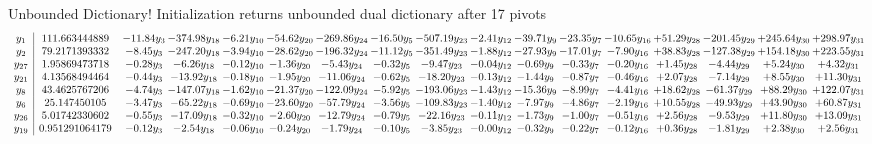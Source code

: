 \documentclass[9pt]{article}
\begin{document}
Unbounded Dictionary!
Initialization returns unbounded dual dictionary after 17 pivots
\[\begin{array}{c| c c@{\hskip 2pt} c@{\hskip 2pt} c@{\hskip 2pt} c@{\hskip 2pt} c@{\hskip 2pt} c@{\hskip 2pt} c@{\hskip 2pt} c@{\hskip 2pt} c@{\hskip 2pt} c@{\hskip 2pt} c@{\hskip 2pt} c@{\hskip 2pt} c@{\hskip 2pt} c@{\hskip 2pt} c@{\hskip 2pt} }
 y_{1}   &  111.663444889 & -11.84 y_{3} & -374.98 y_{18} & -6.21 y_{10} & -54.62 y_{20} & -269.86 y_{24} & -16.50 y_{5} & -507.19 y_{23} & -2.41 y_{12} & -39.71 y_{9} & -23.35 y_{7} & -10.65 y_{16} & + 51.29 y_{28} & -201.45 y_{29} & + 245.64 y_{30} & + 298.97 y_{31}\\
 y_{2}   &  79.2171393332 & -8.45 y_{3} & -247.20 y_{18} & -3.94 y_{10} & -28.62 y_{20} & -196.32 y_{24} & -11.12 y_{5} & -351.49 y_{23} & -1.88 y_{12} & -27.93 y_{9} & -17.01 y_{7} & -7.90 y_{16} & + 38.83 y_{28} & -127.38 y_{29} & + 154.18 y_{30} & + 223.55 y_{31}\\
 y_{27}   &  1.95869473718 & -0.28 y_{3} & -6.26 y_{18} & -0.12 y_{10} & -1.36 y_{20} & -5.43 y_{24} & -0.32 y_{5} & -9.47 y_{23} & -0.04 y_{12} & -0.69 y_{9} & -0.33 y_{7} & -0.20 y_{16} & +  1.45 y_{28} & -4.44 y_{29} & +  5.24 y_{30} & +  4.32 y_{31}\\
 y_{21}   &  4.13568494464 & -0.44 y_{3} & -13.92 y_{18} & -0.18 y_{10} & -1.95 y_{20} & -11.06 y_{24} & -0.62 y_{5} & -18.20 y_{23} & -0.13 y_{12} & -1.44 y_{9} & -0.87 y_{7} & -0.46 y_{16} & +  2.07 y_{28} & -7.14 y_{29} & +  8.55 y_{30} & + 11.30 y_{31}\\
 y_{8}   &  43.4625767206 & -4.74 y_{3} & -147.07 y_{18} & -1.62 y_{10} & -21.37 y_{20} & -122.09 y_{24} & -5.92 y_{5} & -193.06 y_{23} & -1.43 y_{12} & -15.36 y_{9} & -8.99 y_{7} & -4.41 y_{16} & + 18.62 y_{28} & -61.37 y_{29} & + 88.29 y_{30} & + 122.07 y_{31}\\
 y_{6}   &  25.147450105 & -3.47 y_{3} & -65.22 y_{18} & -0.69 y_{10} & -23.60 y_{20} & -57.79 y_{24} & -3.56 y_{5} & -109.83 y_{23} & -1.40 y_{12} & -7.97 y_{9} & -4.86 y_{7} & -2.19 y_{16} & + 10.55 y_{28} & -49.93 y_{29} & + 43.90 y_{30} & + 60.87 y_{31}\\
 y_{26}   &  5.01742330602 & -0.55 y_{3} & -17.09 y_{18} & -0.32 y_{10} & -2.60 y_{20} & -12.79 y_{24} & -0.79 y_{5} & -22.16 y_{23} & -0.11 y_{12} & -1.73 y_{9} & -1.00 y_{7} & -0.51 y_{16} & +  2.56 y_{28} & -9.53 y_{29} & + 11.80 y_{30} & + 13.09 y_{31}\\
 y_{19}   &  0.951291064179 & -0.12 y_{3} & -2.54 y_{18} & -0.06 y_{10} & -0.24 y_{20} & -1.79 y_{24} & -0.10 y_{5} & -3.85 y_{23} & -0.00 y_{12} & -0.32 y_{9} & -0.22 y_{7} & -0.12 y_{16} & +  0.36 y_{28} & -1.81 y_{29} & +  2.38 y_{30} & +  2.56 y_{31}\\

\end{array}\]
\end{document}
